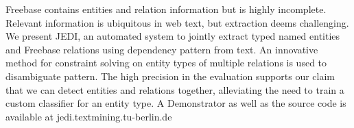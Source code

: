 Freebase contains entities and relation information but is highly incomplete. Relevant information is ubiquitous in web text, but extraction deems challenging. We present JEDI, an automated system to jointly extract typed named entities and Freebase relations using dependency pattern from text. An innovative method for constraint solving on entity types of multiple relations is used to disambiguate pattern. The high precision in the evaluation supports our claim that we can detect entities and relations together, alleviating the need to train a custom classifier for an entity type. A Demonstrator as well as the source code is available at jedi.textmining.tu-berlin.de
